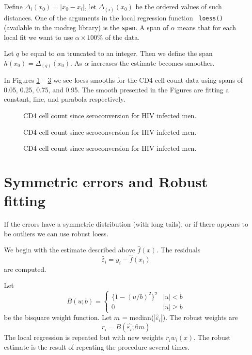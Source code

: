 Define $\Delta_i(x_0) = |x_0 -
x_i|$, let $\Delta_{(i)}(x_0)$ be the ordered values of such
distances. One of the arguments in the local regression function {\tt
  loess()} (available in the modreg library) is the {\tt span}. A span
of $\alpha$ means that for each local fit we want to use
 $\alpha \times 100 \%$ of the data.  

Let $q$ be equal to $\alpha$n
truncated to an integer. Then we define the span $h(x_0) =
\Delta_{(q)}(x_0)$. As $\alpha$ increases the estimate
becomes smoother. 

In Figures \ref{f3.1} -- \ref{f3.3} we see loess smooths for the CD4
cell count data using spans of
0.05, 0.25, 0.75, and 0.95. The smooth presented in the Figures are
fitting a constant, line, and parabola
respectively.


\begin{figure}[htp]
\caption{\label{f3.1} CD4 cell count since seroconversion for HIV infected men.}
\centerline{}
\end{figure}

\begin{figure}[htp]
\caption{\label{f3.2} CD4 cell count since seroconversion for HIV infected men.}
\centerline{}
\end{figure}

\begin{figure}[htp]
\caption{\label{f3.3} CD4 cell count since seroconversion for HIV infected men.}
\centerline{}
\end{figure}


\newpage 

\section{Symmetric errors and Robust fitting}
If the errors have a symmetric distribution (with long tails), or if
there appears to be 
outliers we can use robust loess.


We begin with the estimate described above $\hat{f}(x)$. The residuals
\[
\hat{\varepsilon}_i = y_i  - \hat{f}(x_i)
\]
are computed.

Let
\[
B(u;b) = \left\{ \begin{array}{cc}
\{1 - (u/b)^2\}^2&|u|<b\\
0& |u|\geq b
\end{array}
\right.
\]
be the bisquare weight function. Let $m$ = median($|\hat{\varepsilon}_i|$).
The robust weights are
\[
r_i = B(\hat{\varepsilon_i}; 6m)
\]
The local regression is repeated but with new weights $r_i w_i(x)$. The
robust estimate is the result of repeating the procedure several times.


